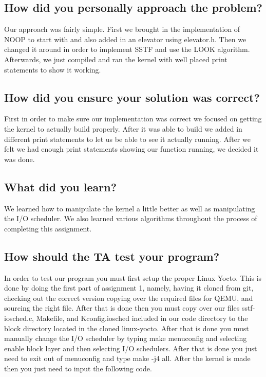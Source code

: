 \documentclass[10pt,letterpaper,onecolumn,draftclsnofoot]{IEEEtran}
\begin{document}
\subsection{How did you personally approach the problem?}
Our approach was fairly simple.
First we brought in the implementation of NOOP to start with and also added in an elevator using elevator.h.
Then we changed it around in order to implement SSTF and use the LOOK algorithm.
Afterwards, we just compiled and ran the kernel with well placed print statements to show it working.

\subsection{How did you ensure your solution was correct?}
First in order to make sure our implementation was correct we focused on getting the kernel to actually build properly.
After it was able to build we added in different print statements to let us be able to see it actually running.
After we felt we had enough print statements showing our function running, we decided it was done.

\subsection{What did you learn?}
We learned how to manipulate the kernel a little better as well as manipulating the I/O scheduler.
We also learned various algorithms throughout the process of completing this assignment.

\subsection{How should the TA test your program?}
In order to test our program you must first setup the proper Linux Yocto.
This is done by doing the first part of assignment 1, namely, having it cloned from git, checking out the correct version copying over the required files for QEMU, and sourcing the right file.
After that is done then you must copy over our files sstf-iosched.c, Makefile, and Kconfig.iosched included in our code directory to the block directory located in the cloned linux-yocto.
After that is done you must manually change the I/O scheduler by typing make menuconfig and selecting enable block layer and then selecting I/O schedulers.
After that is done you just need to exit out of menuconfig and type make -j4 all.
After the kernel is made then you just need to input the following code.
\end{document}
